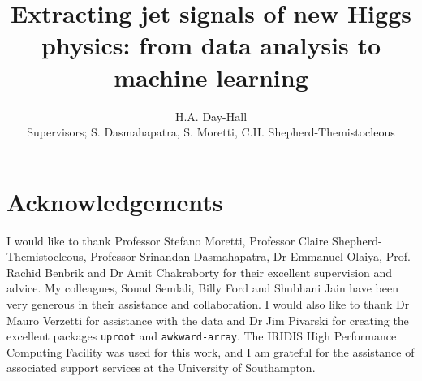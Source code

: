 \documentclass{article}
\begin{document}
\title{Extracting jet signals of new Higgs physics: from data analysis to machine learning}
\author{H.A. Day-Hall \\ {\small Supervisors; S. Dasmahapatra, S. Moretti, C.H. Shepherd-Themistocleous}}
	
	\maketitle
	
	\tableofcontents
    \FloatBarrier
     
    \FloatBarrier
    
    
    \FloatBarrier
    \FloatBarrier
    
    \FloatBarrier
    
    \FloatBarrier
    
    \FloatBarrier
    
    \FloatBarrier
    
    \FloatBarrier
    
    \FloatBarrier
    
    
    \section{Acknowledgements}
    I would like to thank Professor Stefano Moretti, Professor Claire Shepherd-Themistocleous, Professor Srinandan Dasmahapatra, Dr Emmanuel Olaiya, Prof. Rachid Benbrik and Dr Amit Chakraborty for their excellent supervision and advice.
    My colleagues, Souad Semlali, Billy Ford and Shubhani Jain have been very generous in their assistance and collaboration.
    I would also like to thank Dr Mauro Verzetti for assistance with the data and Dr Jim Pivarski for creating the excellent packages \lstinline{uproot} and \lstinline{awkward-array}.
    The IRIDIS High Performance Computing Facility was used for this work,
    and I am grateful for the assistance of associated support services at
    the University of Southampton.
    \printbibliography	
\end{document}
